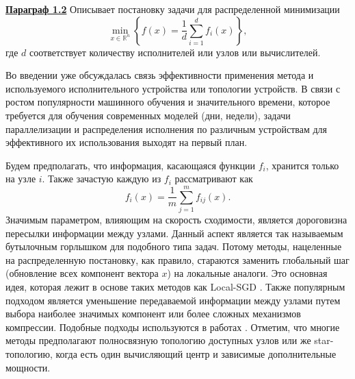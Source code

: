 \underline{\textbf{Параграф 1.2}} Описывает постановку задачи для распределенной минимизации
  $$
    \min_{x \in \mathbb{R}^n}\left\{f(x)=\frac{1}{d} \sum_{i=1}^d f_i(x)\right\},
  $$
  где $d$ соответствует количеству исполнителей или узлов или вычислителей. 

  Во введении уже обсуждалась связь эффективности применения метода и используемого исполнительного устройства или топологии устройств. В связи с ростом популярности машинного обучения и значительного времени, которое требуется для обучения современных моделей (дни, недели), задачи параллелизации и распределения исполнения по различным устройствам для эффективного их использования выходят на первый план.

  Будем предполагать, что информация, касающаяся функции $f_i$, хранится только на узле $i$. Также зачастую каждую из $f_i$ рассматривают как
  $$
    f_i(x) = \frac{1}{m} \sum_{j=1}^m f_{ij}(x).
  $$ 
  Значимым параметром, влияющим на скорость сходимости, является дороговизна пересылки информации между узлами. Данный аспект является так называемым бутылочным горлышком для подобного типа задач. Потому методы, нацеленные на распределенную постановку, как правило, стараются заменить глобальный шаг (обновление всех компонент вектора $x$) на локальные аналоги. Это основная идея, которая лежит в основе таких методов как Local-SGD \cite{Stich2019LocalSC}. Также популярным подходом является уменьшение передаваемой информации между узлами путем выбора наиболее значимых компонент или более сложных механизмов компрессии. Подобные подходы используются в работах \cite{qlsgd, qsgd, err_fdbk}. Отметим, что многие методы предполагают полносвязную топологию доступных узлов или же star-топологию, когда есть один вычисляющий центр и зависимые дополнительные мощности. 

